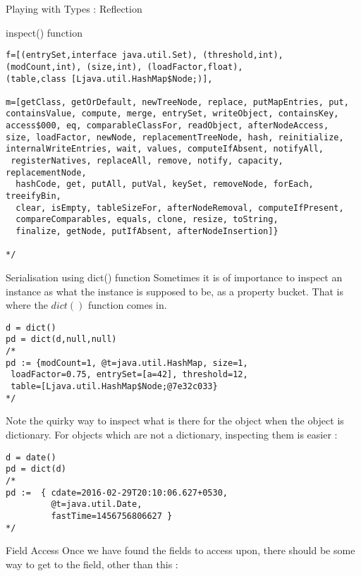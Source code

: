 \begin{section}{Playing with Types : Reflection}
\begin{subsection}{inspect() function}
\begin{center}
\begin{minipage}{\linewidth}
\begin{lstlisting}[style=JexlStyle]
f=[(entrySet,interface java.util.Set), (threshold,int), 
(modCount,int), (size,int), (loadFactor,float), 
(table,class [Ljava.util.HashMap$Node;)], 

m=[getClass, getOrDefault, newTreeNode, replace, putMapEntries, put, 
containsValue, compute, merge, entrySet, writeObject, containsKey, 
access$000, eq, comparableClassFor, readObject, afterNodeAccess, 
size, loadFactor, newNode, replacementTreeNode, hash, reinitialize, 
internalWriteEntries, wait, values, computeIfAbsent, notifyAll,
 registerNatives, replaceAll, remove, notify, capacity, replacementNode,
  hashCode, get, putAll, putVal, keySet, removeNode, forEach, treeifyBin, 
  clear, isEmpty, tableSizeFor, afterNodeRemoval, computeIfPresent, 
  compareComparables, equals, clone, resize, toString, 
  finalize, getNode, putIfAbsent, afterNodeInsertion]}

*/
\end{lstlisting}
\end{minipage}\end{center}

\end{subsection}

\begin{subsection}{Serialisation using dict() function}
Sometimes it is of importance to inspect an instance as 
what the instance is supposed to be, as a property bucket.
That is where the $dict()$ function comes in.

\begin{lstlisting}[style=JexlStyle]
d = dict()
pd = dict(d,null,null)
/* 
pd := {modCount=1, @t=java.util.HashMap, size=1, 
 loadFactor=0.75, entrySet=[a=42], threshold=12, 
 table=[Ljava.util.HashMap$Node;@7e32c033} 
*/
\end{lstlisting}
Note the quirky way to inspect what is there for the object when the object is dictionary.
For objects which are not a dictionary, inspecting them is easier :

\begin{lstlisting}[style=JexlStyle]
d = date()
pd = dict(d)
/* 
pd :=  { cdate=2016-02-29T20:10:06.627+0530, 
         @t=java.util.Date, 
         fastTime=1456756806627 } 
*/
\end{lstlisting}
\end{subsection}

\begin{subsection}{Field Access}
Once we have found the fields to access upon, 
there should be some way to get to the field, other than this :


\end{subsection}
\end{section}
